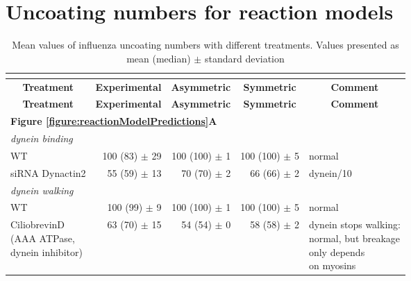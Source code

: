 \section{Uncoating numbers for reaction models}
\label{appendix:uncoatingNumbers}

\begin{landscape}

\begin{longtable}{@{}lrrrl@{}}
\caption[Mean values of influenza uncoating numbers]{Mean values of influenza uncoating numbers with different treatments.\\Values presented as mean (median) $\pm$ standard deviation}\\
\label{table:ReactionModelUncoatingNumbers}\\

\toprule
\multicolumn{1}{c}{\textbf{Treatment}}&
\multicolumn{1}{c}{\textbf{Experimental}}&
\multicolumn{1}{c}{\textbf{Asymmetric}}&
\multicolumn{1}{c}{\textbf{Symmetric}}&
\multicolumn{1}{c}{\textbf{Comment}}\\
\midrule

\endfirsthead
\toprule
\multicolumn{1}{c}{\textbf{Treatment}}&
\multicolumn{1}{c}{\textbf{Experimental}}&
\multicolumn{1}{c}{\textbf{Asymmetric}}&
\multicolumn{1}{c}{\textbf{Symmetric}}&
\multicolumn{1}{c}{\textbf{Comment}}\\
\midrule
\endhead %

\midrule
\multicolumn{5}{l}{\textbf{Figure \ref{figure:reactionModelPredictions}A}}\\
\midrule
\multicolumn{5}{l}{\textit{dynein binding}}\\
WT &
100 (83) $\pm$ 29 &
100 (100) $\pm$ 1 &
100 (100) $\pm$ 5 &
normal\\
siRNA Dynactin2 &
55 (59) $\pm$ 13 &
70 (70) $\pm$ 2 &
66 (66) $\pm$ 2 &
dynein/10\\

\midrule
\multicolumn{5}{l}{\textit{dynein walking}}\\
WT &
100 (99) $\pm$ 9 &
100 (100) $\pm$ 1 &
100 (100) $\pm$ 5 &
normal \\
\makecell[l]{CiliobrevinD \\(AAA ATPase,\\dynein inhibitor)} &
63 (70) $\pm$ 15 &
54 (54) $\pm$ 0 &
58 (58) $\pm$ 2 &
\makecell[l]{dynein stops walking:\\normal, but breakage\\only depends\\on myosins}\\


\end{longtable}
\end{landscape}
